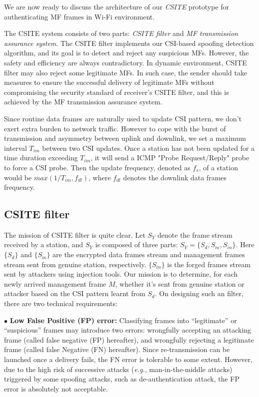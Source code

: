 \documentclass[conference]{IEEEtran}
\def\eg{\textit{e.g.}\xspace}
\begin{document}
We are now ready to discuss the architecture of our
  \textit{CSITE} prototype for authenticating MF frames in Wi-Fi
  environment.

The CSITE system consists of two parts: \emph{CSITE filter}
 and \emph{MF transmission assurance system}.
The CSITE filter implements our CSI-based
 spoofing detection algorithm,
 and its goal is to detect and reject
 any suspicious MFs.
 However, the safety and efficiency are always contradictory.
In dynamic environment, CSITE
 filter may also reject some legitimate MFs.
In such case, the sender
 should take measures to ensure the successful delivery of legitimate
 MFs without compromising the security standard of receiver's CSITE filter, and
 this is achieved by the MF transmission assurance system.




Since routine data frames are naturally used to update CSI pattern, we
don't exert extra burden to network traffic. However to cope with the
burst of transmission and asymmetry between uplink and downlink, we
set a maximum interval $T_{im}$ between two CSI updates.
Once a station has not been updated for a time duration exceeding
 $T_{im}$, it will send a ICMP "Probe Request/Reply" probe
 to force a CSI probe.
Then the update frequency, denoted as
 $f_s$, of a station would be $max(1/T_{im},f_{dl})$, where $f_{dl}$
 denotes the downlink data frames frequency.


\subsection{CSITE filter}
\label{subsec:filter}


The mission of CSITE filter is quite clear.
Let $S_{Y}$ denote the frame stream received by a station, and
$S_{Y}$ is composed of three parts: $ S_Y=\{S_{d}, S_{m}, S_{in}\}
$. Here $\{S_{d}\}$ and $\{S_{m}\}$ are the encrypted data frames
stream and management frames stream sent from genuine station,
respectively. $\{S_{in}\}$ is the forged frames stream sent by
attackers using injection tools. Our mission is to determine, for each
newly arrived management frame $M$,  whether it's sent from genuine
station or attacker based on the CSI pattern learnt from $S_{d}$.
On designing such an filter, there are two technical requirements:

$\bullet$ \textbf{Low False Positive (FP) error:}
Classifying frames into ``legitimate'' or ``suspicious''
 frames may introduce two errors: wrongfully
 accepting an attacking frame (called false negative (FP) hereafter), and
 wrongfully rejecting a legitimate
 frame (called false Negative (FN) hereafter).
Since re-transmission can be launched once a
   delivery fails, the FN error is tolerable to some extent.
However, due to the high risk of successive attacks (\eg,
 man-in-the-middle attacks) triggered by some
 spoofing attacks, such as de-authentication attack, the FP error
  is absolutely not acceptable.
\end{document}
